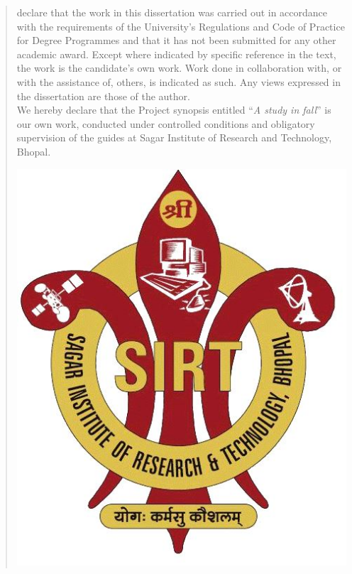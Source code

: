 \begin{SingleSpace}
\begin{quote}
 declare that the work in this dissertation was carried out in accordance with the requirements of  the University's Regulations and Code of Practice for Degree Programmes and that it  has not been submitted for any other academic award. Except where indicated by specific  reference in the text, the work is the candidate's own work. Work done in collaboration with, or with the assistance of, others, is indicated as such. Any views expressed in the dissertation are those of the author. 
\vspace{5mm} \\
We hereby declare that the Project synopsis entitled ``\emph{A study in fall}'' is our own work, conducted under controlled conditions and obligatory supervision of the guides at Sagar Institute of Research and Technology, Bhopal.
\begin{center}
\vspace{6mm}
\includegraphics[scale=0.25]{logos/sirt_logo}\\
\vspace{6mm}

\end{center}



\end{quote}
\end{SingleSpace}
